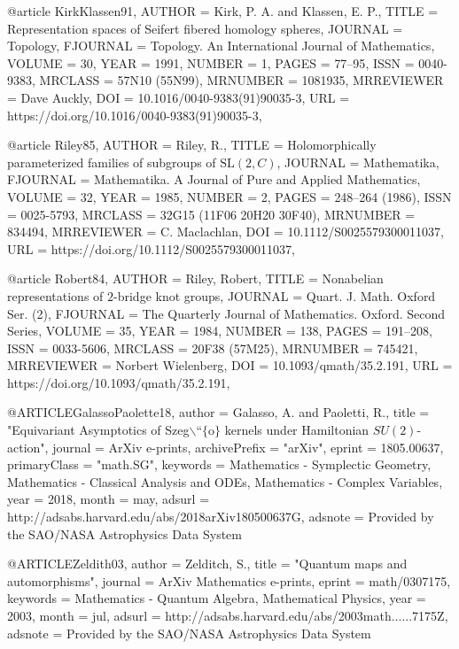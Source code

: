 @article {KirkKlassen91,
    AUTHOR = {Kirk, P. A. and Klassen, E. P.},
     TITLE = {Representation spaces of {S}eifert fibered homology spheres},
   JOURNAL = {Topology},
  FJOURNAL = {Topology. An International Journal of Mathematics},
    VOLUME = {30},
      YEAR = {1991},
    NUMBER = {1},
     PAGES = {77--95},
      ISSN = {0040-9383},
   MRCLASS = {57N10 (55N99)},
  MRNUMBER = {1081935},
MRREVIEWER = {Dave Auckly},
       DOI = {10.1016/0040-9383(91)90035-3},
       URL = {https://doi.org/10.1016/0040-9383(91)90035-3},
}

@article {Riley85,
    AUTHOR = {Riley, R.},
     TITLE = {Holomorphically parameterized families of subgroups of {$\text{
              SL}(2,{ C})$}},
   JOURNAL = {Mathematika},
  FJOURNAL = {Mathematika. A Journal of Pure and Applied Mathematics},
    VOLUME = {32},
      YEAR = {1985},
    NUMBER = {2},
     PAGES = {248--264 (1986)},
      ISSN = {0025-5793},
   MRCLASS = {32G15 (11F06 20H20 30F40)},
  MRNUMBER = {834494},
MRREVIEWER = {C. Maclachlan},
       DOI = {10.1112/S0025579300011037},
       URL = {https://doi.org/10.1112/S0025579300011037},
}

@article {Robert84,
    AUTHOR = {Riley, Robert},
     TITLE = {Nonabelian representations of {$2$}-bridge knot groups},
   JOURNAL = {Quart. J. Math. Oxford Ser. (2)},
  FJOURNAL = {The Quarterly Journal of Mathematics. Oxford. Second Series},
    VOLUME = {35},
      YEAR = {1984},
    NUMBER = {138},
     PAGES = {191--208},
      ISSN = {0033-5606},
   MRCLASS = {20F38 (57M25)},
  MRNUMBER = {745421},
MRREVIEWER = {Norbert Wielenberg},
       DOI = {10.1093/qmath/35.2.191},
       URL = {https://doi.org/10.1093/qmath/35.2.191},
}

@ARTICLE{GalassoPaolette18,
   author = {{Galasso}, A. and {Paoletti}, R.},
    title = "{Equivariant Asymptotics of Szeg$\backslash$``$\{$o$\}$ kernels under Hamiltonian $SU(2)$-action}",
  journal = {ArXiv e-prints},
archivePrefix = "arXiv",
   eprint = {1805.00637},
 primaryClass = "math.SG",
 keywords = {Mathematics - Symplectic Geometry, Mathematics - Classical Analysis and ODEs, Mathematics - Complex Variables},
     year = 2018,
    month = may,
   adsurl = {http://adsabs.harvard.edu/abs/2018arXiv180500637G},
  adsnote = {Provided by the SAO/NASA Astrophysics Data System}
}

@ARTICLE{Zeldith03,
   author = {{Zelditch}, S.},
    title = "{Quantum maps and automorphisms}",
  journal = {ArXiv Mathematics e-prints},
   eprint = {math/0307175},
 keywords = {Mathematics - Quantum Algebra, Mathematical Physics},
     year = 2003,
    month = jul,
   adsurl = {http://adsabs.harvard.edu/abs/2003math......7175Z},
  adsnote = {Provided by the SAO/NASA Astrophysics Data System}
}

